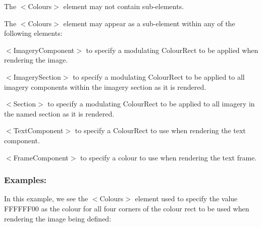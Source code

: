 \begin{DoxyItemize}
\item The {\ttfamily $<$Colours$>$} element may not contain sub-\/elements.


\item The {\ttfamily $<$Colours$>$} element may appear as a sub-\/element within any of the following elements\+: 
\begin{DoxyItemize}
\item {\ttfamily $<$Imagery\+Component$>$} to specify a modulating Colour\+Rect to be applied when rendering the image. 
\item {\ttfamily $<$Imagery\+Section$>$} to specify a modulating Colour\+Rect to be applied to all imagery components within the imagery section as it is rendered. 
\item {\ttfamily $<$Section$>$} to specify a modulating Colour\+Rect to be applied to all imagery in the named section as it is rendered. 
\item {\ttfamily $<$Text\+Component$>$} to specify a Colour\+Rect to use when rendering the text component. 
\item {\ttfamily $<$Frame\+Component$>$} to specify a colour to use when rendering the text frame. 
\end{DoxyItemize}
\end{DoxyItemize}\hypertarget{fal_element_ref_fal_elem_ref_sec_8_4}{}\subsubsection{Examples\+:}\label{fal_element_ref_fal_elem_ref_sec_8_4}
In this example, we see the {\ttfamily $<$Colours$>$} element used to specify the value \textquotesingle{}F\+F\+F\+F\+F\+F00\textquotesingle{} as the colour for all four corners of the colour rect to be used when rendering the image being defined\+: 
\begin{DoxyCode}{0}
\DoxyCodeLine{  />}
\end{DoxyCode}
